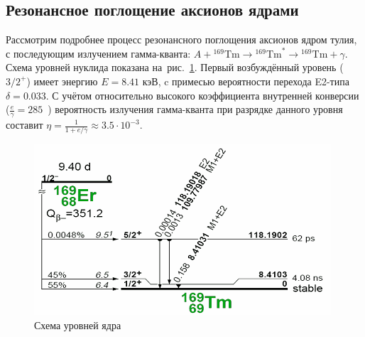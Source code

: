 \documentclass[a4paper,article,14pt]{extarticle}
\begin{document}
\subsection{Резонансное поглощение аксионов ядрами {\Tm}}

Рассмотрим подробнее процесс резонансного поглощения аксионов ядром тулия, с последующим излучением гамма-кванта: $A + {}^{169}\mathrm{Tm} \rightarrow {}^{169}\mathrm{Tm}^{*} \rightarrow {}^{169}\mathrm{Tm} + \gamma$.
Схема уровней нуклида {\Tm} показана на~рис.~\ref{tmlvls}.
Первый возбуждённый уровень ($3/2^+$) имеет энергию $E = 8.41 \text{\ кэВ}$, c  примесью вероятности перехода E2-типа $\delta = 0.033$.
С учётом относительно высокого коэффициента внутренней конверсии ($\frac{e}{\gamma} = 285$~\cite{lederer1978table}) вероятность излучения гамма-кванта при разрядке данного уровня составит $\eta = \frac{1}{1 + e/\gamma} \approx 3.5 \cdot 10^{-3}$.
\begin{figure}[t]
    \centering
    \includegraphics[width = 0.75 \textwidth]{images/Tmlevels.png}
    \caption{Схема уровней ядра {\Tm}~\cite{lederer1978table}}\label{tmlvls}
\end{figure}
\end{document}
